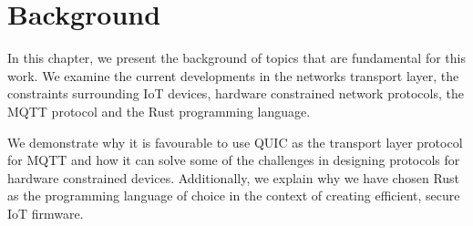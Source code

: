 \chapter{Background} \label{chap:back}

In this chapter, we present the background of topics that are fundamental for this work.
We examine the current developments in the networks transport layer, the constraints surrounding IoT devices, hardware constrained network protocols, the MQTT protocol and the Rust programming language.

We demonstrate why it is favourable to use QUIC as the transport layer protocol for MQTT and how it can solve some of the challenges in designing protocols for hardware constrained devices.
Additionally, we explain why we have chosen Rust as the programming language of choice in the context of creating efficient, secure IoT firmware.






